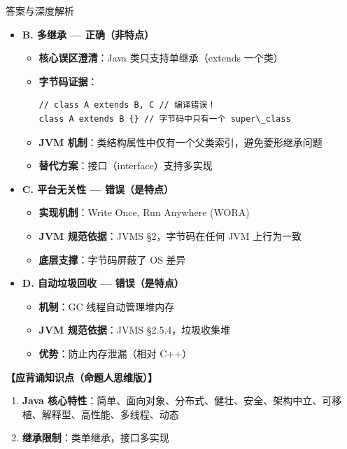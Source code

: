 ﻿\documentclass[12pt, a4paper]{ctexart}
\begin{document}
\begin{enumerate}[label=\textbf{\arabic*.}, itemsep=1em]
\begin{bluebox}{答案与深度解析}
\begin{itemize}[leftmargin=*, nosep]
			      \item \textbf{B. 多继承 — 正确（非特点）}
			            \begin{itemize}[leftmargin=*, nosep]
				            \item \textbf{核心误区澄清}：Java 类只支持单继承（extends 一个类）
				            \item \textbf{字节码证据}：
				                  \begin{lstlisting}[style=JavaExam]
// class A extends B, C // 编译错误！
class A extends B {} // 字节码中只有一个 super\_class
            \end{lstlisting}
				            \item \textbf{JVM 机制}：类结构属性中仅有一个父类索引，避免菱形继承问题
				            \item \textbf{替代方案}：接口（interface）支持多实现
			            \end{itemize}

			      \item \textbf{C. 平台无关性 — 错误（是特点）}
			            \begin{itemize}[leftmargin=*, nosep]
				            \item \textbf{实现机制}：Write Once, Run Anywhere (WORA)
				            \item \textbf{JVM 规范依据}：JVMS §2，字节码在任何 JVM 上行为一致
				            \item \textbf{底层支撑}：字节码屏蔽了 OS 差异
			            \end{itemize}

			      \item \textbf{D. 自动垃圾回收 — 错误（是特点）}
			            \begin{itemize}[leftmargin=*, nosep]
				            \item \textbf{机制}：GC 线程自动管理堆内存
				            \item \textbf{JVM 规范依据}：JVMS §2.5.4，垃圾收集堆
				            \item \textbf{优势}：防止内存泄漏（相对 C++）
			            \end{itemize}
		      \end{itemize}

		      \textbf{【应背诵知识点（命题人思维版）】}
		      \begin{enumerate}[leftmargin=*, nosep]
			      \item \textbf{Java 核心特性}：简单、面向对象、分布式、健壮、安全、架构中立、可移植、解释型、高性能、多线程、动态
			      \item \textbf{继承限制}：类单继承，接口多实现
		      \end{enumerate}


\end{bluebox}
\end{enumerate}
\end{document}
